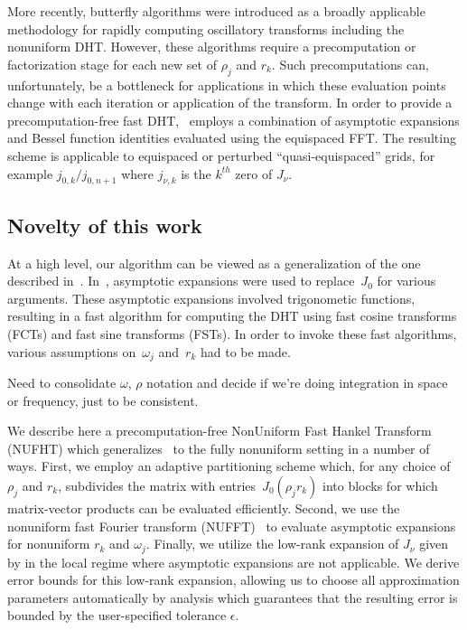 More recently, butterfly algorithms \cite{oneil2010algorithm, li2015butterfly,
pang2020interpolative} were introduced as a broadly applicable methodology for
rapidly computing oscillatory transforms including the nonuniform DHT. However,
these algorithms require a precomputation or factorization stage for each new
set of $\rho_j$ and $r_k$. Such precomputations can, unfortunately, be a
bottleneck for applications in which these evaluation points change with each
iteration or application of the transform. In order to provide a
precomputation-free fast DHT,~\cite{townsend2015fast} employs a combination of
asymptotic expansions and Bessel function identities evaluated using the
equispaced FFT. The resulting scheme is applicable to equispaced or perturbed
``quasi-equispaced'' grids, for example $j_{0,k} / j_{0,n+1}$ where $j_{\nu,k}$
is the $k^{th}$ zero of $J_\nu$.



\subsection*{Novelty of this work}
\label{sec:novelty}

At a high level, our algorithm can be viewed as a generalization of the one
described in~\cite{townsend2015fast}. In~\cite{townsend2015fast}, asymptotic
expansions were used to replace~$J_0$ for various arguments. These asymptotic
expansions involved trigonometic functions, resulting in a fast algorithm for
computing the DHT using fast cosine transforms (FCTs) and fast sine transforms
(FSTs). In order to invoke these fast algorithms, various assumptions
on~$\omega_j$ and~$r_k$ had to be made.

{\color{red} Need to consolidate $\omega$, $\rho$ notation and decide if we're
doing integration in space or frequency, just to be consistent.}

We describe here a precomputation-free NonUniform Fast Hankel Transform (NUFHT)
which generalizes~\cite{townsend2015fast} to the fully nonuniform setting in a
number of ways. First, we employ an adaptive partitioning scheme which, for any
choice of $\rho_j$ and $r_k$, subdivides the matrix with entries~$J_0(\rho_j r_k)$ into blocks for which
matrix-vector products can be evaluated efficiently. Second, we use the
nonuniform fast Fourier transform (NUFFT)~\cite{dutt1993fast,
greengard2004accelerating} to evaluate asymptotic expansions for nonuniform
$r_k$ and $\omega_j$. Finally, we utilize the low-rank expansion of $J_\nu$
given by \cite{wimp1962polynomial} in the local regime where asymptotic
expansions are not applicable. We derive error bounds for this low-rank
expansion, allowing us to choose all approximation parameters automatically by
analysis which guarantees that the resulting error is bounded by the
user-specified tolerance $\epsilon$.

